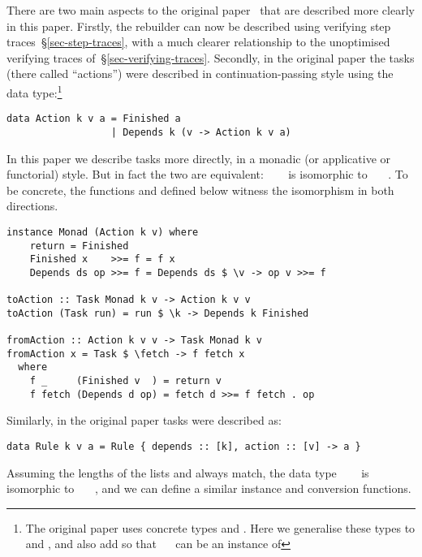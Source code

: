 There are two main
aspects to the original \Shake paper~\cite{mitchell2012shake} that are described
more clearly in this paper. Firstly, the rebuilder can now be described using
verifying step traces~\S\ref{sec-step-traces}, with a much clearer relationship
to the unoptimised verifying traces of~\S\ref{sec-verifying-traces}. Secondly,
in the original paper the tasks (there called ``actions'')
were described in continuation-passing style using the data type:\footnote{
The original paper uses concrete types  and . Here we
generalise these types to  and , and also add  so that
~~ can be an instance of }
\vspace{1mm}
\begin{verbatim}
data Action k v a = Finished a
                  | Depends k (v -> Action k v a)
\end{verbatim}
\vspace{1mm}

\noindent
In this paper we describe tasks more directly, in a monadic (or applicative or functorial)
style. But in fact the two are equivalent: ~~~ is
isomorphic to ~~~.
To be concrete, the functions  and  defined below
witness the isomorphism in both directions.

\vspace{1mm}
\begin{verbatim}
instance Monad (Action k v) where
    return = Finished
    Finished x    >>= f = f x
    Depends ds op >>= f = Depends ds $ \v -> op v >>= f

toAction :: Task Monad k v -> Action k v v
toAction (Task run) = run $ \k -> Depends k Finished

fromAction :: Action k v v -> Task Monad k v
fromAction x = Task $ \fetch -> f fetch x
  where
    f _     (Finished v  ) = return v
    f fetch (Depends d op) = fetch d >>= f fetch . op
\end{verbatim}
\vspace{1mm}

\noindent
Similarly, in the original paper \Make tasks were described as:

\vspace{1mm}
\begin{verbatim}
data Rule k v a = Rule { depends :: [k], action :: [v] -> a }
\end{verbatim}
\vspace{1mm}
\noindent
Assuming the lengths of the lists \hs{[@@k]} and \hs{[@@v]} always match, the
data type ~~~ is isomorphic to
~~~, and we can define a similar
 instance and conversion functions.

